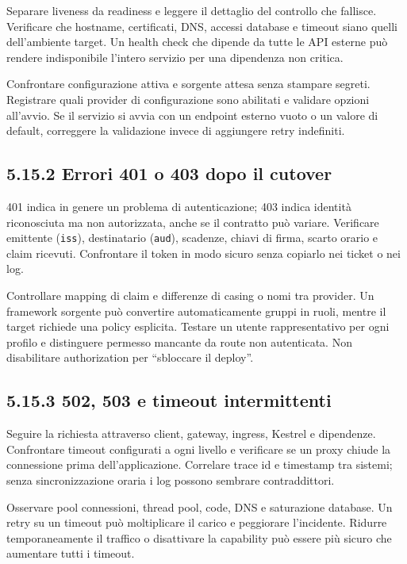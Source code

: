 \documentclass[
  italian,
  10pt,
]{book}
\begin{document}
Separare liveness da readiness e leggere il dettaglio del controllo che
fallisce. Verificare che hostname, certificati, DNS, accessi database e
timeout siano quelli dell'ambiente target. Un health check che dipende
da tutte le API esterne può rendere indisponibile l'intero servizio per
una dipendenza non critica.

Confrontare configurazione attiva e sorgente attesa senza stampare
segreti. Registrare quali provider di configurazione sono abilitati e
validare opzioni all'avvio. Se il servizio si avvia con un endpoint
esterno vuoto o un valore di default, correggere la validazione invece
di aggiungere retry indefiniti.

\subsection{5.15.2 Errori 401 o 403 dopo il
cutover}\label{errori-401-o-403-dopo-il-cutover}

401 indica in genere un problema di autenticazione; 403 indica identità
riconosciuta ma non autorizzata, anche se il contratto può variare.
Verificare emittente (\texttt{iss}), destinatario (\texttt{aud}),
scadenze, chiavi di firma, scarto orario e claim ricevuti. Confrontare
il token in modo sicuro senza copiarlo nei ticket o nei log.

Controllare mapping di claim e differenze di casing o nomi tra provider.
Un framework sorgente può convertire automaticamente gruppi in ruoli,
mentre il target richiede una policy esplicita. Testare un utente
rappresentativo per ogni profilo e distinguere permesso mancante da
route non autenticata. Non disabilitare authorization per ``sbloccare il
deploy''.

\subsection{5.15.3 502, 503 e timeout
intermittenti}\label{e-timeout-intermittenti}

Seguire la richiesta attraverso client, gateway, ingress, Kestrel e
dipendenze. Confrontare timeout configurati a ogni livello e verificare
se un proxy chiude la connessione prima dell'applicazione. Correlare
trace id e timestamp tra sistemi; senza sincronizzazione oraria i log
possono sembrare contraddittori.

Osservare pool connessioni, thread pool, code, DNS e saturazione
database. Un retry su un timeout può moltiplicare il carico e peggiorare
l'incidente. Ridurre temporaneamente il traffico o disattivare la
capability può essere più sicuro che aumentare tutti i timeout.
\end{document}
